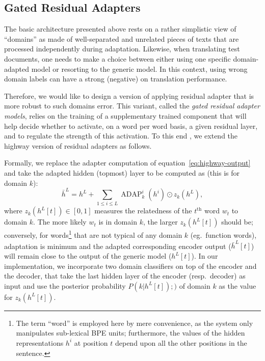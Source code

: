 \documentclass[11pt,a4paper]{article}
\newcommand{\fyDone}[1]{\done[FY]\Todo[FY:]{\textcolor{orange}{#1}}}
\newcommand{\mpTodo}[1]{\Todo[MP:]{\textcolor{green}{#1}}}
\begin{document}
\subsection{Gated Residual Adapters \label{ssec:gate}}
\mpTodo{Formalizing problem, network design, training algorithm}
The basic architecture presented above rests on a rather simplistic view of ``domains'' as made of well-separated and unrelated pieces of texts that are processed independently during adaptation. Likewise, when translating test documents, one needs to make a choice between either using one specific domain-adapted model or resorting to the generic model. In this context, using wrong domain labels can have a strong (negative) on translation performance. 

Therefore, we would like to design a version of applying residual adapter that is more robust to such domains error. This variant, called the \emph{gated residual adapter models}, relies on the training of a supplementary trained component that will help decide whether to activate, on a word per word basis, a given residual layer, and to regulate the strength of this activation. To this end , we extend the highway version of residual adapters as follows.
\fyDone{Consistency of notations wrt section 2.1}

Formally, we replace the adapter computation of equation~\eqref{eq:highway-output} and take the adapted hidden (topmost) layer to be computed as (this is for domain $k$):
\begin{equation}
  \bar{h}^L = h^L + \displaystyle{\mathop{\sum}_{1 \leq i \leq L} \operatorname{ADAP}_k^i(h^i) \odot{} z_k(h^L)}, \label{eq:gated-output}
\end{equation}
where $z_k(h^L[t]) \in [0,1]$ measures the relatedness of the $t^{\text{th}}$ word $w_t$ to domain $k$. The more likely $w_t$ is in domain $k$, the larger $z_k(h^L[t])$ should be; conversely, for words\footnote{The term ``word'' is employed here by mere convenience, as the system only manipulates sub-lexical BPE units; furthermore, the values of the hidden representations $h^{i}$ at position $t$ depend upon all the other positions in the sentence.} that are not typical of any domain $k$ (eg.\ function words),  adaptation is minimum and the adapted corresponding encoder output ($\bar{h}^L[t]$) will remain close to the output of the generic model ($h^L[t]$). In our implementation, we incorporate two domain classifiers on top of the encoder and the decoder, that take the last hidden layer of the encoder (resp.\ decoder) as input and use the posterior probability $P(k|h^L[t]);)$ of domain $k$ as the value for $z_k(h^L[t])$.
\end{document}

